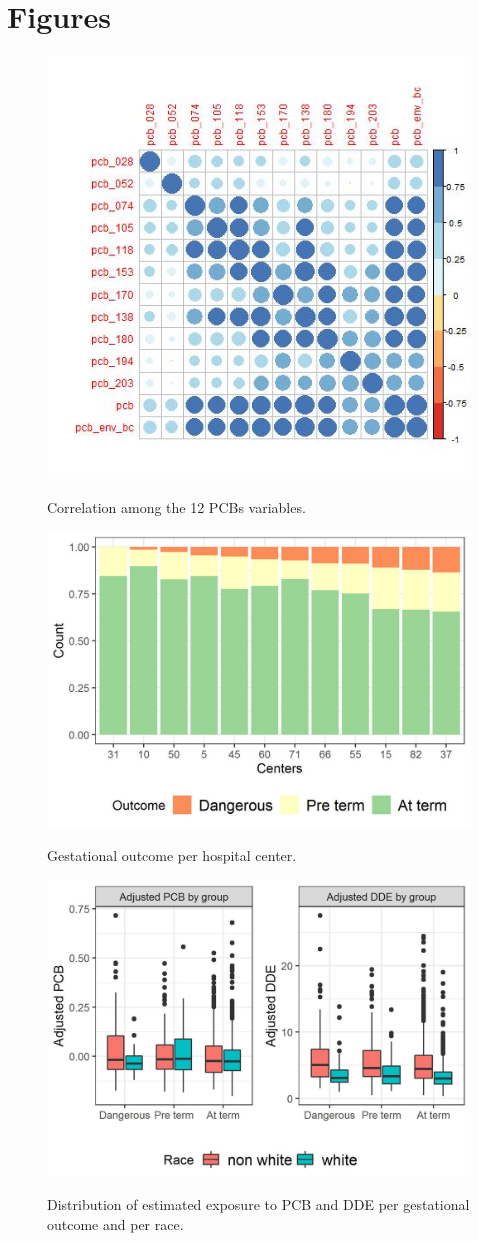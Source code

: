 \documentclass[10pt]{jmlr}%
\begin{document}
\section{Figures}
\label{appendix:fig}

\begin{figure}[htbp]
	\centering
	\caption{Correlation among the 12 PCBs variables.}
	\includegraphics[width=0.5\linewidth]{pcb_corr}
	\label{fig:corr}
\end{figure}

\begin{figure}[htbp]
	\centering
	\caption{Gestational outcome per hospital center.}
	\includegraphics[width=0.7\linewidth]{outcome_per_center}
	\label{fig:center}
\end{figure}

\begin{figure}[htbp]
	\centering
	\caption{Distribution of estimated exposure to PCB and DDE per gestational outcome and per race.}
	\includegraphics[width=0.7\linewidth]{pcb_dde_per_gest}
	\label{fig:pcb}
\end{figure}
\end{document}
